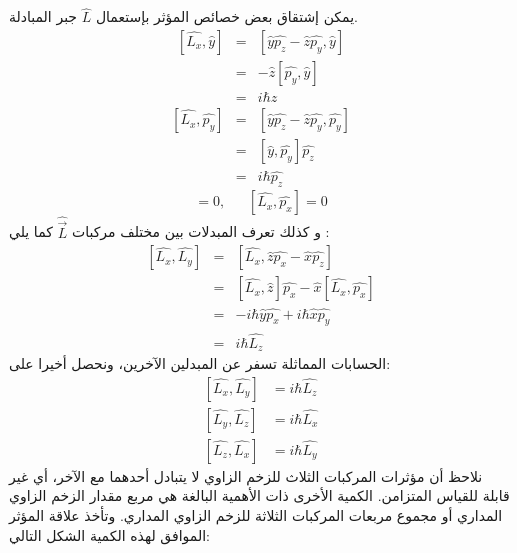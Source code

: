 يمكن إشتقاق بعض خصائص المؤثر بإستعمال $ \hat{L}$ جبر المبادلة.
\begin{equation}
	\label{eqn:3-5}
	\begin{array}{ccl}
		[\hat{L_{x}}, \hat{y}] & = &  [\hat{y}\hat{p_{z}} - \hat{z}\hat{p_{y}}, \hat{y}] \\
		 & = & -\hat{z}[\hat{p_{y}}, \hat{y}] \\
		& = & i\hbar \hat{z}
	\end{array}
\end{equation} 
\begin{equation}
	\label{eqn:3-6}
	\begin{array}{ccl}
		[\hat{L_{x}}, \hat{p_{y}}] & = &  [\hat{y}\hat{p_{z}} - \hat{z}\hat{p_{y}}, \hat{p_{y}}] \\
		& = & [\hat{y},\hat{p_{y}}]\hat{p_{z}} \\
		& = & i\hbar \hat{p_{z}}
	\end{array}
\end{equation} 
\begin{equation}
	[\hat{L_{x}}, \hat{x}] = 0 , ~~~~~~~ [\hat{L_{x}}, \hat{p_{x}}] = 0
\end{equation}
و كذلك تعرف المبدلات بين مختلف مركبات $\hat{\vec{L}}$ كما يلي : 
\begin{equation}
	\label{eqn:3-8}
	\begin{array}{ccl}
		[\hat{L_{x}}, \hat{L_{y}}] & = &  [\hat{L_{x}}, \hat{z}\hat{p_{x}}-\hat{x}\hat{p_{z}}] \\
		& = & [\hat{L_{x}},\hat{z}]\hat{p_{x}}- \hat{x}[\hat{L_{x}}, \hat{p_{x}}]\\
		& = & - i\hbar \hat{y}\hat{p_{x}} + i\hbar \hat{x}\hat{p_{y}} \\
		& = & i\hbar \hat{L_{z}}
	\end{array}
\end{equation} 
الحسابات المماثلة تسفر عن المبدلين الآخرين، ونحصل أخيرا على:
\begin{equation}
	\label{eqn:3-9}
	\begin{aligned}
	[\hat{L_{x}}, \hat{L_{y}}] & =  i\hbar \hat{L_{z}}  \\
	[\hat{L_{y}}, \hat{L_{z}}] & =  i\hbar \hat{L_{x}} \\
	[\hat{L_{z}}, \hat{L_{x}}] & =  i\hbar \hat{L_{y}} 
    \end{aligned}
\end{equation} 
نلاحظ أن مؤثرات المركبات الثلاث للزخم الزاوي لا يتبادل أحدهما مع اﻵخر، أي غير قابلة للقياس المتزامن. الكمية اﻷخرى ذات اﻷهمية البالغة هي مربع مقدار الزخم الزاوي المداري أو مجموع مربعات المركبات الثلاثة للزخم الزاوي المداري. وتأخذ علاقة المؤثر الموافق لهذه الكمية الشكل التالي:

